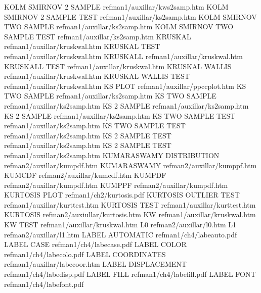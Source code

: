 KOLM SMIRNOV 2 SAMPLE                   refman1/auxillar/kws2samp.htm
KOLM SMIRNOV 2 SAMPLE TEST              refman1/auxillar/ks2samp.htm
KOLM SMIRNOV TWO SAMPLE                 refman1/auxillar/ks2samp.htm
KOLM SMIRNOV TWO SAMPLE TEST            refman1/auxillar/ks2samp.htm
KRUSKAL                                 refman1/auxillar/kruskwal.htm
KRUSKAL TEST                            refman1/auxillar/kruskwal.htm
KRUSKALL                                refman1/auxillar/kruskwal.htm
KRUSKALL TEST                           refman1/auxillar/kruskwal.htm
KRUSKAL WALLIS                          refman1/auxillar/kruskwal.htm
KRUSKAL WALLIS TEST                     refman1/auxillar/kruskwal.htm
KS PLOT                                 refman1/auxillar/ppccplot.htm
KS TWO SAMPLE                           refman1/auxillar/ks2samp.htm
KS TWO SAMPLE                           refman1/auxillar/ks2samp.htm
KS 2 SAMPLE                             refman1/auxillar/ks2samp.htm
KS 2 SAMPLE                             refman1/auxillar/ks2samp.htm
KS TWO SAMPLE TEST                      refman1/auxillar/ks2samp.htm
KS TWO SAMPLE TEST                      refman1/auxillar/ks2samp.htm
KS 2 SAMPLE TEST                        refman1/auxillar/ks2samp.htm
KS 2 SAMPLE TEST                        refman1/auxillar/ks2samp.htm
KUMARASWAMY DISTRIBUTION                refman2/auxillar/kumpdf.htm
KUMARASWAMY                             refman2/auxillar/kumppf.htm
KUMCDF                                  refman2/auxillar/kumcdf.htm
KUMPDF                                  refman2/auxillar/kumpdf.htm
KUMPPF                                  refman2/auxillar/kumpdf.htm
KURTOSIS PLOT                           refman1/ch2/kurtosis.pdf
KURTOSIS OUTLIER TEST                   refman1/auxillar/kurttest.htm
KURTOSIS TEST                           refman1/auxillar/kurttest.htm
KURTOSIS                                refman2/auxiullar/kurtosis.htm
KW                                      refman1/auxillar/kruskwal.htm
KW TEST                                 refman1/auxillar/kruskwal.htm
L0                                      refman2/auxillar/l0.htm
L1                                      refman2/auxillar/l1.htm
LABEL AUTOMATIC                         refman1/ch4/labeauto.pdf
LABEL CASE                              refman1/ch4/labecase.pdf
LABEL COLOR                             refman1/ch4/labecolo.pdf
LABEL COORDINATES                       refman1/auxillar/labecoor.htm
LABEL DISPLACEMENT                      refman1/ch4/labedisp.pdf
LABEL FILL                              refman1/ch4/labefill.pdf
LABEL FONT                              refman1/ch4/labefont.pdf
